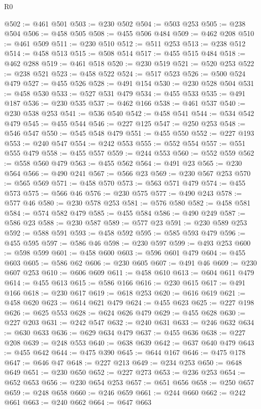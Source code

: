 \begin{lexlean}{R0}
\begin{coremodule}
@502 := @461 @501
@503 := @230 @502
@504 := @503 @253
@505 := @238 @504
@506 := @458 @505
@508 := @455 @506 @484
@509 := @462 @208
@510 := @461 @509
@511 := @230 @510
@512 := @511 @253
@513 := @238 @512
@514 := @458 @513
@515 := @508 @514
@517 := @455 @515 @484
@518 := @462 @288
@519 := @461 @518
@520 := @230 @519
@521 := @520 @253
@522 := @238 @521
@523 := @458 @522
@524 := @517 @523
@526 := @500 @524 @479
@527 := @455 @526
@528 := @491 @154
@530 := @230 @528 @504
@531 := @458 @530
@533 := @527 @531 @479
@534 := @455 @533
@535 := @491 @187
@536 := @230 @535
@537 := @462 @166
@538 := @461 @537
@540 := @230 @538 @253
@541 := @536 @540
@542 := @458 @541
@544 := @534 @542 @479
@545 := @455 @544
@546 := @227 @125
@547 := @250 @253
@548 := @546 @547
@550 := @545 @548 @479
@551 := @455 @550
@552 := @227 @193
@553 := @240 @547
@554 := @242 @553
@555 := @552 @554
@557 := @551 @555 @479
@558 := @455 @557
@559 := @244 @553
@560 := @552 @559
@562 := @558 @560 @479
@563 := @455 @562
@564 := @491 @23
@565 := @230 @564
@566 := @490 @241
@567 := @566 @23
@569 := @230 @567 @253
@570 := @565 @569
@571 := @458 @570
@573 := @563 @571 @479
@574 := @455 @573
@575 := @566 @46
@576 := @230 @575
@577 := @490 @243
@578 := @577 @46
@580 := @230 @578 @253
@581 := @576 @580
@582 := @458 @581
@584 := @574 @582 @479
@585 := @455 @584
@586 := @490 @249
@587 := @586 @23
@588 := @230 @587
@589 := @577 @23
@591 := @230 @589 @253
@592 := @588 @591
@593 := @458 @592
@595 := @585 @593 @479
@596 := @455 @595
@597 := @586 @46
@598 := @230 @597
@599 := @493 @253
@600 := @598 @599
@601 := @458 @600
@603 := @596 @601 @479
@604 := @455 @603
@605 := @586 @62
@606 := @230 @605
@607 := @491 @46
@609 := @230 @607 @253
@610 := @606 @609
@611 := @458 @610
@613 := @604 @611 @479
@614 := @455 @613
@615 := @586 @166
@616 := @230 @615
@617 := @491 @166
@618 := @230 @617
@619 := @618 @253
@620 := @616 @619
@621 := @458 @620
@623 := @614 @621 @479
@624 := @455 @623
@625 := @227 @198
@626 := @625 @553
@628 := @624 @626 @479
@629 := @455 @628
@630 := @227 @203
@631 := @242 @547
@632 := @240 @631
@633 := @246 @632
@634 := @630 @633
@636 := @629 @634 @479
@637 := @455 @636
@638 := @227 @208
@639 := @248 @553
@640 := @638 @639
@642 := @637 @640 @479
@643 := @455 @642
@644 := @475 @390
@645 := @644 @167
@646 := @475 @178
@647 := @646 @47
@648 := @227 @213
@649 := @234 @253
@650 := @648 @649
@651 := @230 @650
@652 := @227 @273
@653 := @236 @253
@654 := @652 @653
@656 := @230 @654 @253
@657 := @651 @656
@658 := @250 @657
@659 := @248 @658
@660 := @246 @659
@661 := @244 @660
@662 := @242 @661
@663 := @240 @662
@664 := @647 @663

\end{coremodule}
\end{lexlean}
